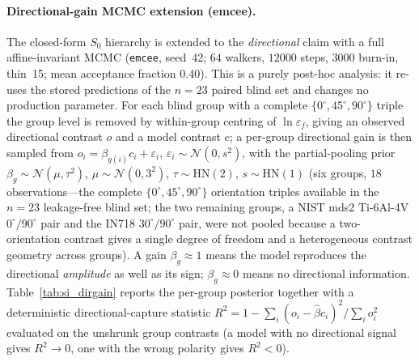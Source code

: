 \documentclass[12pt,a4paper,twocolumn]{article}
\providecommand{\ang}[1]{\ensuremath{#1^{\circ}}}
\begin{document}
\paragraph{Directional-gain MCMC extension (emcee).}
The closed-form $S_0$ hierarchy is extended to the \emph{directional} claim with a full affine-invariant MCMC (\texttt{emcee}, seed~42; $64$ walkers, $12000$ steps, $3000$ burn-in, thin~15; mean acceptance fraction $0.40$). This is a purely post-hoc analysis: it re-uses the stored predictions of the $n=23$ paired blind set and changes no production parameter. For each blind group with a complete $\{\ang{0},\ang{45},\ang{90}\}$ triple the group level is removed by within-group centring of $\ln\varepsilon_f$, giving an observed directional contrast $o$ and a model contrast $c$; a per-group directional gain is then sampled from $o_i = \beta_{g(i)} c_i + \varepsilon_i$, $\varepsilon_i\sim\mathcal{N}(0,s^2)$, with the partial-pooling prior $\beta_g\sim\mathcal{N}(\mu,\tau^2)$, $\mu\sim\mathcal{N}(0,3^2)$, $\tau\sim\mathrm{HN}(2)$, $s\sim\mathrm{HN}(1)$ (six groups, $18$ observations---the complete $\{\ang{0},\ang{45},\ang{90}\}$ orientation triples available in the $n=23$ leakage-free blind set; the two remaining groups, a NIST mds2 Ti-6Al-4V $\ang{0}/\ang{90}$ pair and the IN718 $\ang{30}/\ang{90}$ pair, were not pooled because a two-orientation contrast gives a single degree of freedom and a heterogeneous contrast geometry across groups). A gain $\beta_g\approx1$ means the model reproduces the directional \emph{amplitude} as well as its sign; $\beta_g\approx0$ means no directional information. Table~\ref{tab:si_dirgain} reports the per-group posterior together with a deterministic directional-capture statistic $R^2 = 1-\sum_i(o_i-\hat\beta c_i)^2/\sum_i o_i^2$ evaluated on the unshrunk group contrasts (a model with no directional signal gives $R^2\to0$, one with the wrong polarity gives $R^2<0$).
\end{document}
